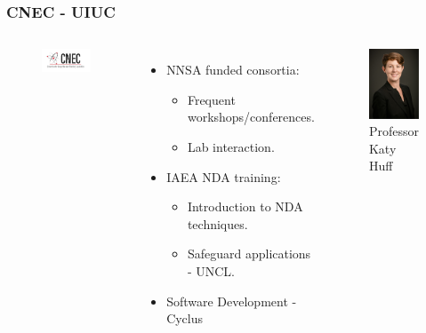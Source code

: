\begin{frame}
\frametitle{CNEC - UIUC}
\begin{columns}
	\column[t]{5cm}
	\begin{figure}
		\includegraphics[width=\linewidth]{cnec}
	\end{figure}
	\begin{itemize}
		\item NNSA funded consortia:
		\begin{itemize}
			\item Frequent workshops/conferences.
			\item Lab interaction.
		\end{itemize}
		\item IAEA NDA training:
		\begin{itemize}
			\item Introduction to NDA techniques.
			\item Safeguard applications - UNCL.
		\end{itemize}
		\item Software Development - Cyclus
	\end{itemize}
	\column[t]{6cm}
	\begin{figure}
		\includegraphics[width=0.7\linewidth]{katy}
		\caption{Professor Katy Huff}
	\end{figure}
\end{columns}
\end{frame}